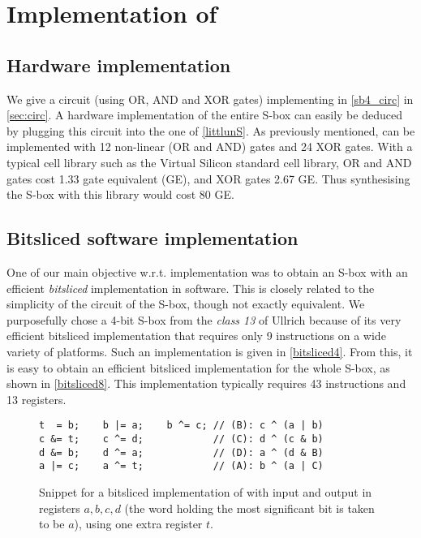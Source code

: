 \section{Implementation of \littlunOne}
\label{sec:implem}

\subsection{Hardware implementation}
We give a circuit (using OR, AND and XOR gates) implementing \littlunS in \autoref{sb4_circ} in \autoref{sec:circ}.
A hardware implementation of the entire S-box can easily be deduced by plugging this circuit into the one of \autoref{littlunS}.
As previously mentioned, \littlunOne can be implemented with 12 non-linear (OR and AND) gates and 24 XOR gates. With a typical cell library
such as the Virtual Silicon standard cell library, OR and AND gates cost 1.33 gate equivalent (GE), and XOR gates 2.67 GE. Thus synthesising
the S-box with this library would cost 80 GE. 

\subsection{Bitsliced software implementation}
One of our main objective w.r.t. implementation was to obtain an S-box with an efficient \emph{bitsliced} implementation in
software. This is closely related to the simplicity of the circuit of the S-box, though not exactly equivalent.
We purposefully chose a 4-bit S-box from the \emph{class 13} of Ullrich \etal \cite{skew} because of its very
efficient bitsliced implementation that requires only 9 instructions
on a wide variety of platforms.
Such an implementation is given in \autoref{bitsliced4}.
From this, it is easy to obtain an efficient bitsliced implementation for the whole S-box, as shown in \autoref{bitsliced8}.
This implementation typically requires 43 instructions and 13 registers.

\begin{figure}[ht]
\begin{verbatim}
t  = b;    b |= a;    b ^= c; // (B): c ^ (a | b)
c &= t;    c ^= d;            // (C): d ^ (c & b)
d &= b;    d ^= a;            // (D): a ^ (d & B)
a |= c;    a ^= t;            // (A): b ^ (a | C)
\end{verbatim}
\caption[Snippet for a bitsliced \C implementation of \littlunS.]{Snippet for a bitsliced \C implementation of \littlunS \label{bitsliced4} with input and output in registers $a,b,c,d$ (the word holding the most significant bit is taken to be $a$), using one extra register $t$.}
\end{figure}


